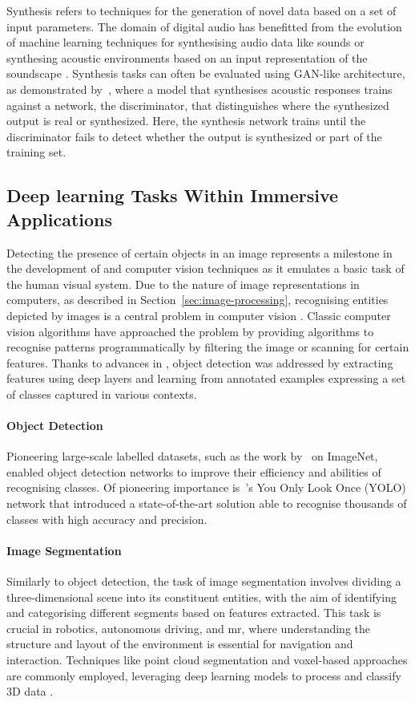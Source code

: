 Synthesis refers to techniques for the generation of novel data based on a set of input parameters. The domain of digital audio has benefitted from the evolution of machine learning techniques for synthesising audio data like sounds or synthesing acoustic environments based on an input representation of the soundscape \citep{liu2020sound, ahn2023novel}. Synthesis tasks can often be evaluated using GAN-like architecture, as demonstrated by~\cite{Singh_2021_ICCV}, where a model that synthesises acoustic responses trains against a network, the discriminator, that distinguishes where the synthesized output is real or synthesized. Here, the synthesis network trains until the discriminator fails to detect whether the output is synthesized or part of the training set. 

\subsection{Deep learning Tasks Within Immersive Applications}
Detecting the presence of certain objects in an image represents a milestone in the development of  and computer vision techniques as it emulates a basic task of the human visual system. Due to the nature of image representations in computers, as described in Section~\ref{sec:image-processing}, recognising entities depicted by images is a central problem in computer vision \citep{szeliski2022computer}. Classic computer vision algorithms have approached the problem by providing algorithms to recognise patterns programmatically by filtering the image or scanning for certain features. Thanks to advances in , object detection was addressed by extracting features using deep layers and learning from annotated examples expressing a set of classes captured in various contexts.\par
\paragraph{Object Detection}
Pioneering large-scale labelled datasets, such as the work by~\cite{deng2009imagenet} on ImageNet, enabled object detection networks to improve their efficiency and abilities of recognising classes. Of pioneering importance is~\cite{Redmon_2016_CVPR}'s You Only Look Once (YOLO) network that introduced a state-of-the-art solution able to recognise thousands of classes with high accuracy and precision.\par
\paragraph{Image Segmentation}
Similarly to object detection, the task of image segmentation involves dividing a three-dimensional scene into its constituent entities, with the aim of identifying and categorising different segments based on features extracted. This task is crucial in robotics, autonomous driving, and \acrshort{mr}, where understanding the structure and layout of the environment is essential for navigation and interaction. Techniques like point cloud segmentation and voxel-based approaches are commonly employed, leveraging deep learning models to process and classify 3D data \citep{minae_segmentation, feng2020semantic3d, kalogerakis20173d}.\par
